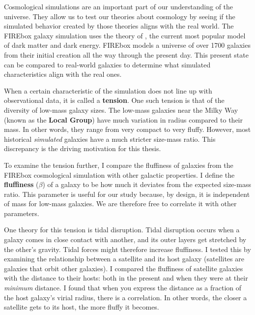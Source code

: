 
Cosmological simulations are an important part of our understanding of the universe. They allow us to test our theories about cosmology by seeing if the simulated behavior created by those theories aligns with the real world. The FIREbox galaxy simulation uses the theory of \textbf{\lcdm}, the current most popular model of dark matter and dark energy. FIREbox models a universe of over 1700 galaxies from their initial creation all the way through the present day. This present state can be compared to real-world galaxies to determine what simulated characteristics align with the real ones.

When a certain characteristic of the simulation does not line up with observational data, it is called a \textbf{tension}. One such tension is that of the diversity of low-mass galaxy sizes. The low-mass galaxies near the Milky Way (known as the \textbf{Local Group}) have much variation in radius compared to their mass. In other words, they range from very compact to very fluffy. However, most historical \emph{simulated} galaxies have a much stricter size-mass ratio. This discrepancy is the driving motivation for this thesis.

To examine the tension further, I compare the fluffiness of galaxies from the FIREbox cosmological simulation with other galactic properties. I define the \textbf{fluffiness} ($\beta$) of a galaxy to be how much it deviates from the expected size-mass ratio. This parameter is useful for our study because, by design, it is independent of mass for low-mass galaxies. We are therefore free to correlate it with other parameters.

One theory for this tension is tidal disruption. Tidal disruption occurs when a galaxy comes in close contact with another, and its outer layers get stretched by the other's gravity. Tidal forces might therefore increase fluffiness. I tested this by examining the relationship between a satellite and its host galaxy (satellites are galaxies that orbit other galaxies). I compared the fluffiness of satellite galaxies with the distance to their hosts: both in the present and when they were at their \emph{minimum} distance. I found that when you express the distance as a fraction of the host galaxy's virial radius, there is a correlation. In other words, the closer a satellite gets to its host, the more fluffy it becomes.